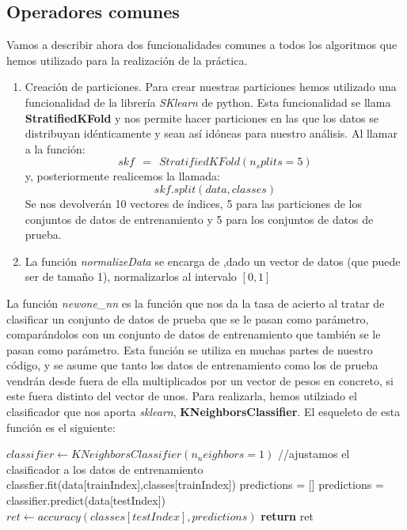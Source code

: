 \documentclass[11pt]{article}
\begin{document}
\subsection{Operadores comunes}
Vamos a describir ahora dos funcionalidades comunes a todos los algoritmos que hemos utilizado para la realización de la práctica.\\

\begin{enumerate}
	\item Creación de particiones. Para crear nuestras particiones hemos utilizado una funcionalidad de la librería \emph{SKlearn} de python. Esta funcionalidad se llama \textbf{StratifiedKFold} y nos permite hacer particiones en las que los datos se distribuyan idénticamente y sean así idóneas para nuestro análisis. Al llamar a la función:
	\[
	skf \ \ = \ \ StratifiedKFold(n_splits = 5)
	\]
y, posteriormente realicemos la llamada:
\[
skf.split(data,classes)
\]
Se nos devolverán 10 vectores de índices, 5 para las particiones de los conjuntos de datos de entrenamiento y 5 para los conjuntos de datos de prueba.

	\item La función \emph{normalizeData} se encarga de ,dado un vector de datos (que puede ser de tamaño 1), normalizarlos al intervalo $[0,1]$\\
\end{enumerate}



La función \emph{newone\_nn} es la función que nos da la tasa de acierto al tratar de clasificar un conjunto de datos de prueba que se le pasan como parámetro, comparándolos con un conjunto de datos de entrenamiento que también se le pasan como parámetro. Esta función se utiliza en muchas partes de nuestro código, y se asume que tanto los datos de entrenamiento como los de prueba vendrán desde fuera de ella multiplicados por un vector de pesos en concreto, si este fuera distinto del vector de unos.  Para realizarla, hemos utilziado el clasificador que nos aporta \emph{sklearn}, \textbf{KNeighborsClassifier}. El esqueleto de esta función es el siguiente:
\begin{algorithmic}[1]
\State $classifier \gets KNeighborsClassifier(n_neighbors = 1)$
\State //ajustamos el clasificador a los datos de entrenamiento
\State classfier.fit(data[trainIndex],classes[trainIndex])
\State predictions = []
\State predictions = classifier.predict(data[testIndex])
\State $ret \gets accuracy(classes[testIndex],predictions)$
\State \textbf{return} ret

\EndProcedure
\end{algorithmic}
\end{document}
